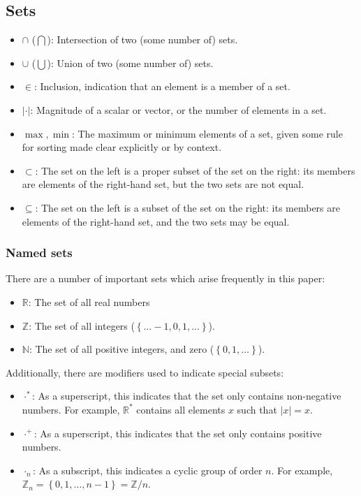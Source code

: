 \documentclass{article}
\newcommand{\braces}[1]{\ensuremath{\left\lbrace #1 \right\rbrace}}
\newcommand{\integers}{\ensuremath{\mathbb{Z}}}
\newcommand{\wholes}{\ensuremath{\mathbb{N}}}
\newcommand{\reals}{\ensuremath{\mathbb{R}}}
\newcommand{\abs}[1]{\ensuremath{\left|#1\right|}}
\begin{document}
\begin{appendix}
\subsection{Sets}
\begin{itemize}
\item $\cap$ ($\bigcap$): Intersection of two (some number of) sets.
\item $\cup$ ($\bigcup$): Union of two (some number of) sets.
\item $\in$: Inclusion, indication that an element is a member of a set.
\item $\abs{\cdot}$: Magnitude of a scalar or vector, or the number of elements in a set.
\item $\max,\min$: The maximum or minimum elements of a set, given some rule for sorting made clear explicitly or by context.
\item $\subset$: The set on the left is a proper subset of the set on the right: its members are elements of the right-hand set, but the two sets are not equal.
\item $\subseteq$: The set on the left is a subset of the set on the right: its members are elements of the right-hand set, and the two sets may be equal.
\end{itemize}

\subsubsection{Named sets}
There are a number of important sets which arise frequently in this paper:
\begin{itemize}
\item \reals: The set of all real numbers
\item \integers: The set of all integers (\braces{\ldots-1,0,1,\ldots}).
\item \wholes: The set of all positive integers, and zero (\braces{0,1,\ldots}).
\end{itemize}
Additionally, there are modifiers used to indicate special subsets:
\begin{itemize}
\item $\cdot^{*}$: As a superscript, this indicates that the set only contains non-negative numbers. For example, $\reals^{*}$ contains all elements $x$ such that $\abs{x}=x$.
\item $\cdot^{+}$: As a superscript, this indicates that the set only contains positive numbers. 
\item $\cdot_{n}$: As a subscript, this indicates a cyclic group of order $n$. For example, $\integers_{n}=\braces{0,1,\ldots,n-1}=\integers/n$. 
\end{itemize}


\end{appendix}
\end{document}
